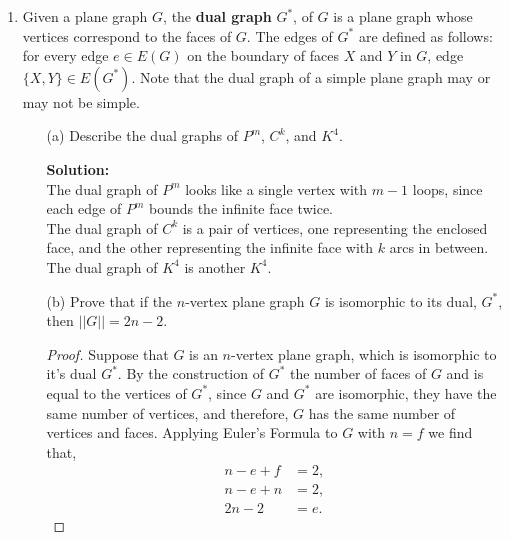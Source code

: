 \documentclass[12pt]{article}
\renewcommand{\emph}[1]{\textsf{\textbf{#1}}}
\newcommand{\localhead}[1]{\par\smallskip\textbf{#1}\nobreak\\}%
\newcommand\solution{\localhead{Solution:}}
\begin{document}
\begin{enumerate}
	\item Given a plane graph $G$, the \emph{dual graph} $G^*$, of $G$ is a plane graph whose vertices correspond to the faces of $G$. The edges of $G^*$ are defined as follows: for every edge $e \in E(G)$ on the boundary of faces $X$ and $Y$ in $G$, edge $\{X, Y\} \in E(G^*)$. Note that the dual graph of a simple plane graph may or may not be simple. 
	\begin{enumerate}
		\item[(a)] Describe the dual graphs of $P^m$, $C^k$, and $K^4$. 
		\solution
		The dual graph of $P^m$ looks like a single vertex with $m - 1$ loops, since each edge of $P^m$ bounds the infinite face twice.\\

		The dual graph of $C^k$ is a pair of vertices, one representing the enclosed face, and the other representing the infinite face with $k$ arcs in between. \\

		The dual graph of $K^4$ is another $K^4$. \\

		





		\item[(b)] Prove that if the $n$-vertex plane graph $G$ is isomorphic to its dual, $G^*$, then $\lvert|G|\rvert = 2n - 2$.  
		\begin{proof} Suppose that $G$ is an $n$-vertex plane graph, which is isomorphic to it's dual $G^*$. By the construction of $G^*$ the number of faces of $G$ and is equal to the vertices of $G^*$, since $G$ and $G^*$ are isomorphic, they have the same number of vertices, and therefore, $G$ has the same number of vertices and faces. Applying Euler's Formula to $G$ with $n = f$ we find that, 
			\begin{align*}
				n - e + f &= 2,\\
				n - e + n &= 2,\\
				2n - 2&=e.
			\end{align*}
		\end{proof}
	\end{enumerate}


	
	
	
	

















\end{enumerate}
\end{document}
